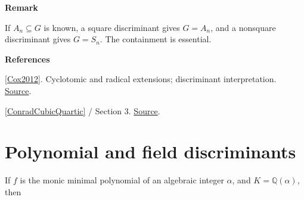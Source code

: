 \documentclass[11pt,a4paper,oneside,openany]{book}
\newenvironment{sources}{\par\smallskip\begingroup\footnotesize\color{atlasgray}\leftskip=10pt\setlength{\parskip}{2pt}}{\par\endgroup\smallskip}
\begin{document}
\begin{atlasblock}[boundary]
\textbf{\sffamily Remark}\par\smallskip
\color{black} If \(A_n\subseteq G\) is known, a square discriminant gives \(G=A_n\), and a nonsquare discriminant gives \(G=S_n\). The containment is essential.\par
\end{atlasblock}\color{black}
\begin{sources}
\textbf{References}\par\smallskip
\noindent\hyperlink{ref:Cox2012}{[Cox2012]}. Cyclotomic and radical extensions; discriminant interpretation. \href{https://onlinelibrary.wiley.com/doi/book/10.1002/9781118218457}{Source}.\par
\noindent\hyperlink{ref:ConradCubicQuartic}{[ConradCubicQuartic]} / Section 3.  \href{https://kconrad.math.uconn.edu/blurbs/galoistheory/cubicquartic.pdf}{Source}.\par
\end{sources}\color{black}
\section{Polynomial and field discriminants}
\color{black} If \(f\) is the monic minimal polynomial of an algebraic integer \(\alpha\), and \(K=\mathbb Q(\alpha)\), then\par
\end{document}
